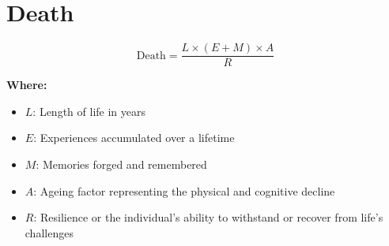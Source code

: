 \chapter{Death}

\begin{equation}
\text{Death} = \frac{L \times (E + M) \times A}{R}
\end{equation}

\textbf{Where:}

\begin{itemize}
    \item $L$: Length of life in years
    \item $E$: Experiences accumulated over a lifetime
    \item $M$: Memories forged and remembered
    \item $A$: Ageing factor representing the physical and cognitive decline
    \item $R$: Resilience or the individual's ability to withstand or recover from life's challenges
\end{itemize}